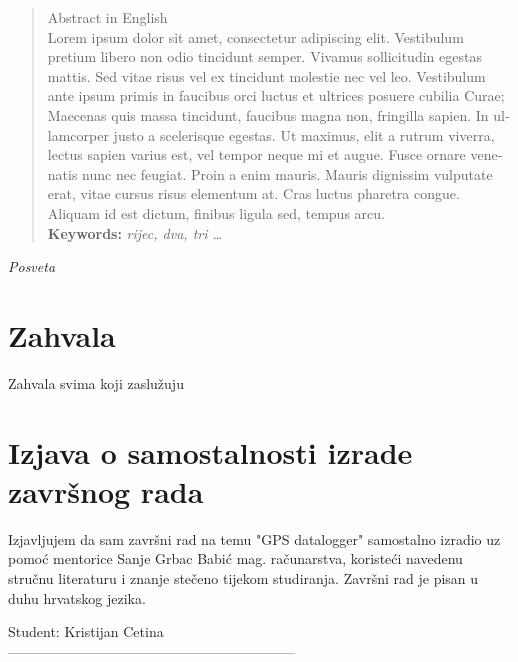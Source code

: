 \documentclass[11pt,a4paper,openright]{report}
\begin{document}
\begin{titlepage}
\begin{otherlanguage}{english} 
\begin{abstract}
Abstract in English\\
Lorem ipsum dolor sit amet, consectetur adipiscing elit. Vestibulum pretium libero non odio tincidunt semper. Vivamus sollicitudin egestas mattis. Sed vitae risus vel ex tincidunt molestie nec vel leo. Vestibulum ante ipsum primis in faucibus orci luctus et ultrices posuere cubilia Curae; Maecenas quis massa tincidunt, faucibus magna non, fringilla sapien. In ullamcorper justo a scelerisque egestas. Ut maximus, elit a rutrum viverra, lectus sapien varius est, vel tempor neque mi et augue. Fusce ornare venenatis nunc nec feugiat. Proin a enim mauris. Mauris dignissim vulputate erat, vitae cursus risus elementum at. Cras luctus pharetra congue. Aliquam id est dictum, finibus ligula sed, tempus arcu. \\

\textbf{Keywords:} \textit{rijec, dva, tri \ldots}

\end{abstract}
\end{otherlanguage}

\end{titlepage}
\newpage

\vspace*{\fill}
\begin{flushright}
\textit{Posveta}
\end{flushright}
\vspace*{\fill}
\newpage

\section*{Zahvala}
Zahvala svima koji zaslužuju
\newpage

\section*{Izjava o samostalnosti izrade završnog rada}
Izjavljujem da sam završni rad na temu "GPS datalogger" samostalno izradio uz pomoć mentorice Sanje Grbac Babić mag. računarstva, koristeći navedenu stručnu literaturu i znanje stečeno tijekom studiranja. Završni rad je pisan u duhu hrvatskog jezika.
\vspace{\fill}
\begin{flushright}
Student: Kristijan Cetina\\
\vspace{15mm}
--------------------------------------------------------------
\end{flushright}
\newpage
\end{document}

